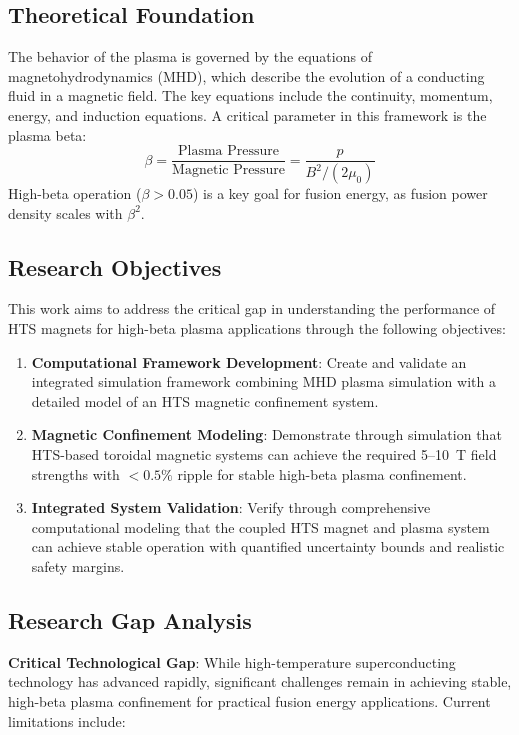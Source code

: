 \documentclass[10pt,twocolumn]{article}
\begin{document}
\subsection{Theoretical Foundation}

The behavior of the plasma is governed by the equations of magnetohydrodynamics (MHD), which describe the evolution of a conducting fluid in a magnetic field. The key equations include the continuity, momentum, energy, and induction equations. A critical parameter in this framework is the plasma beta:
\begin{equation}
\beta = \frac{\text{Plasma Pressure}}{\text{Magnetic Pressure}} = \frac{p}{B^2 / (2\mu_0)}
\end{equation}
High-beta operation ($\beta > 0.05$) is a key goal for fusion energy, as fusion power density scales with $\beta^2$.

\subsection{Research Objectives}

This work aims to address the critical gap in understanding the performance of HTS magnets for high-beta plasma applications through the following objectives:

\begin{enumerate}
\item \textbf{Computational Framework Development}: Create and validate an integrated simulation framework combining MHD plasma simulation with a detailed model of an HTS magnetic confinement system.

\item \textbf{Magnetic Confinement Modeling}: Demonstrate through simulation that HTS-based toroidal magnetic systems can achieve the required 5--10~T field strengths with $<0.5\%$ ripple for stable high-beta plasma confinement.

\item \textbf{Integrated System Validation}: Verify through comprehensive computational modeling that the coupled HTS magnet and plasma system can achieve stable operation with quantified uncertainty bounds and realistic safety margins.
\end{enumerate}

\subsection{Research Gap Analysis}

\textbf{Critical Technological Gap}: While high-temperature superconducting technology has advanced rapidly, significant challenges remain in achieving stable, high-beta plasma confinement for practical fusion energy applications. Current limitations include:
\end{document}
